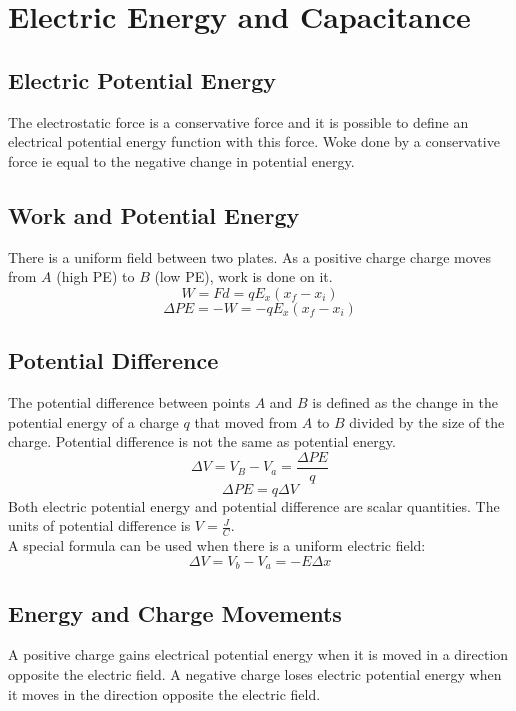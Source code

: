 \section{Electric Energy and Capacitance}

\subsection{Electric Potential Energy}
The electrostatic force is a conservative force and it is possible to define an electrical potential energy function with this force. Woke done by a conservative force ie equal to the negative change in potential energy.

\subsection{Work and Potential Energy}
There is a uniform field between two plates. As a positive charge charge moves from $A$ (high PE) to $B$ (low PE), work is done on it.
\[W=Fd=qE_x(x_f-x_i)\]
\[\Delta PE=-W=-qE_x (x_f-x_i)\]

\subsection{Potential Difference}
The potential difference between points $A$ and $B$ is defined as the change in the potential energy of a charge $q$ that moved from $A$ to $B$ divided by the size of the charge. Potential difference is not the same as potential energy. \\
\[\Delta V=V_B-V_a=\frac{\Delta PE}{q}\]
\[\Delta PE = q\Delta V\]
Both electric potential energy and potential difference are scalar quantities. The units of potential difference is $V = \frac{J}{C}$.\\

A special formula can be used when there is a uniform electric field:
\[\Delta V= V_b-V_a=-E\Delta x\]

\subsection{Energy and Charge Movements}
A positive charge gains electrical potential energy when it is moved in a direction opposite the electric field. A negative charge loses electric potential energy when it moves in the direction opposite the electric field.\\

